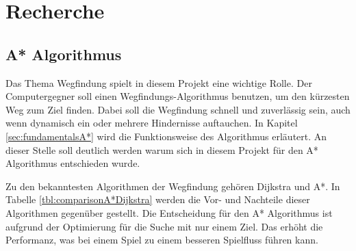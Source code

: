 \chapter{Recherche}
\label{sec:recherche}


\section{A* Algorithmus}
Das Thema Wegfindung spielt in diesem Projekt eine wichtige Rolle. Der Computergegner soll einen Wegfindungs-Algorithmus benutzen, um den kürzesten Weg zum Ziel finden. Dabei soll die Wegfindung schnell und zuverlässig sein, auch wenn dynamisch ein oder mehrere Hindernisse auftauchen. In Kapitel \ref{sec:fundamentalsA*} wird die Funktionsweise des Algorithmus erläutert. An dieser Stelle soll deutlich werden warum sich in diesem Projekt für den A* Algorithmus entschieden wurde.

Zu den bekanntesten Algorithmen der Wegfindung gehören Dijkstra und A*. In Tabelle \ref{tbl:comparisonA*Dijkstra} werden die Vor- und Nachteile dieser Algorithmen gegenüber gestellt. Die Entscheidung für den A* Algorithmus ist aufgrund der Optimierung für die Suche mit nur einem Ziel. Das erhöht die Performanz, was bei einem Spiel zu einem besseren Spielfluss führen kann.


